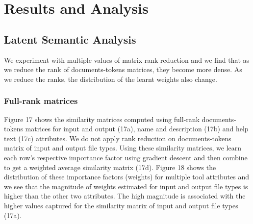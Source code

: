 \chapter{Results and Analysis}
\section{Latent Semantic Analysis}
We experiment with multiple values of matrix rank reduction and we find that as we reduce the rank of documents-tokens matrices, they become more dense. As we reduce the ranks, the distribution of  the learnt weights also change. 

\subsection{Full-rank matrices}
Figure 17 shows the similarity matrices computed using full-rank documents-tokens matrices for input and output (17a), name and description (17b) and help text (17c) attributes. We do not apply rank reduction on documents-tokens matrix of input and output file types. Using these similarity matrices, we learn each row's respective importance factor using gradient descent and then combine to get a weighted average similarity matrix (17d). Figure 18 shows the distribution of these importance factors (weights) for multiple tool attributes and we see that the magnitude of weights estimated for input and output file types is higher than the other two attributes. The high magnitude is associated with the higher values captured for the similarity matrix of input and output file types (17a). 

